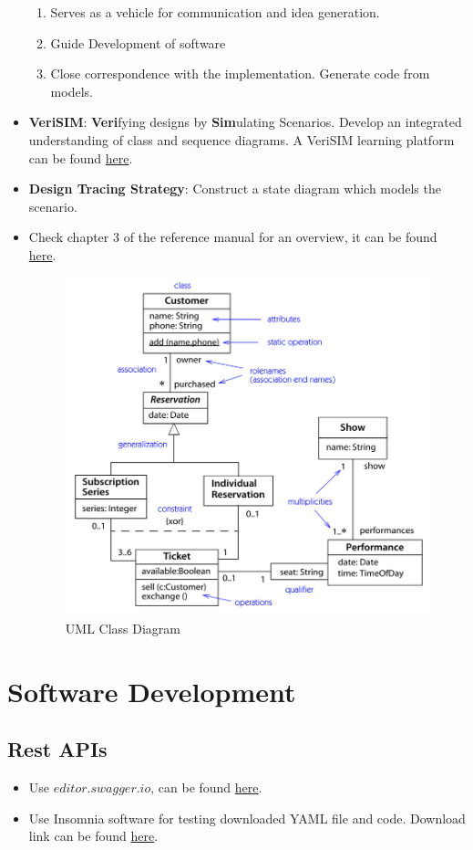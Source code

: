\documentclass[a4paper]{article}
\begin{document}
\begin{itemize}
    \begin{enumerate}
        \item Serves as a vehicle for communication and idea generation.
        \item Guide Development of software
        \item Close correspondence with the implementation. Generate code from models.
    \end{enumerate}
    \item \textbf{VeriSIM}: \textbf{Veri}fying designs by \textbf{Sim}ulating Scenarios. Develop an integrated understanding of class and sequence diagrams. A VeriSIM learning platform can be found \href{https://verisim.tech/}{here}.
    \item \textbf{Design Tracing Strategy}: Construct a state diagram which models the scenario.
    \item Check chapter 3 of the reference manual for an overview, it can be found \href{https://drive.google.com/file/d/1Jd-X3rmu4JLpsZgn1dPV7AFo-NGsFi3H/view}{here}.
    \begin{figure}[H]
        \centering
        \includegraphics[width=0.55\linewidth]{Degree//static/SE_class_diagram.png}
        \caption{UML Class Diagram}
    \end{figure}
\end{itemize}

\section{Software Development}
\subsection{Rest APIs}
\begin{itemize}
    \item Use $editor.swagger.io$, can be found \href{https://editor.swagger.io/}{here}.
    \item Use Insomnia software for testing downloaded YAML file and code. Download link can be found \href{https://insomnia.rest/download}{here}.
\end{itemize}
\end{document}

